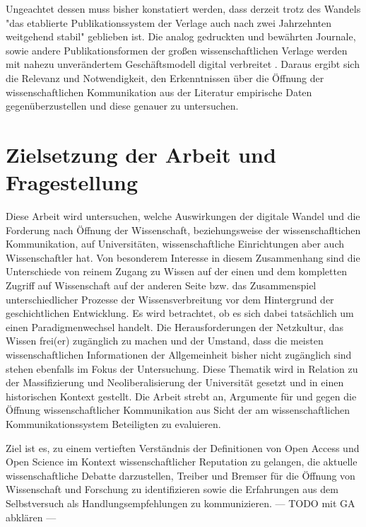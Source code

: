 Ungeachtet dessen muss bisher konstatiert werden, dass derzeit trotz des Wandels "das etablierte Publikationssystem der Verlage auch nach zwei Jahrzehnten weitgehend stabil" \cite{Hanekop_2014} geblieben ist. Die analog gedruckten und bewährten Journale, sowie andere Publikationsformen der großen wissenschaftlichen Verlage werden mit nahezu unverändertem Geschäftsmodell digital verbreitet \cite{Hanekop_2014} \cite{boai_2012}. Daraus ergibt sich die Relevanz und Notwendigkeit, den Erkenntnissen über die Öffnung der wissenschaftlichen Kommunikation aus der Literatur empirische Daten gegenüberzustellen und diese genauer zu untersuchen.

\section{Zielsetzung der Arbeit und Fragestellung} 

Diese Arbeit wird untersuchen, welche Auswirkungen der digitale Wandel und die Forderung nach Öffnung der Wissenschaft, beziehungsweise der wissenschafltichen Kommunikation, auf Universitäten, wissenschaftliche Einrichtungen aber auch Wissenschaftler hat. Von besonderem Interesse in diesem Zusammenhang sind die Unterschiede von reinem Zugang zu Wissen auf der einen und dem kompletten Zugriff auf Wissenschaft auf der anderen Seite bzw. das Zusammenspiel unterschiedlicher Prozesse der Wissensverbreitung vor dem Hintergrund der geschichtlichen Entwicklung. Es wird betrachtet, ob es sich dabei tatsächlich um einen Paradigmenwechsel handelt. Die Herausforderungen der Netzkultur, das Wissen frei(er) zugänglich zu machen und der Umstand, dass die meisten wissenschaftlichen Informationen der Allgemeinheit bisher nicht zugänglich sind \cite{cite:6} stehen ebenfalls im Fokus der Untersuchung. Diese Thematik wird in Relation zu der Massifizierung und Neoliberalisierung der Universität gesetzt und in einen historischen Kontext gestellt. Die Arbeit strebt an, Argumente für und gegen die Öffnung wissenschaftlicher Kommunikation aus Sicht der am wissenschaftlichen Kommunikationssystem Beteiligten zu evaluieren.

Ziel ist es, zu einem vertieften Verständnis der Definitionen von Open Access und Open Science im Kontext wissenschaftlicher Reputation zu gelangen, die aktuelle wissenschaftliche Debatte darzustellen, Treiber und Bremser für die Öffnung von Wissenschaft und Forschung zu identifizieren sowie die Erfahrungen aus dem Selbstversuch als Handlungsempfehlungen zu kommunizieren. --- TODO mit GA abklären --- 

